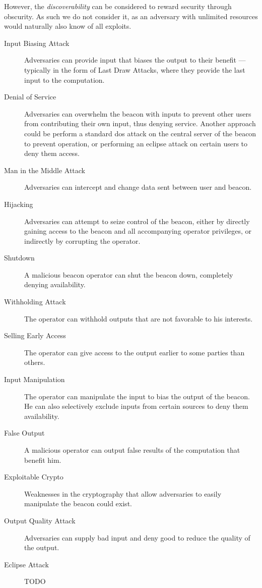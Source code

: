 However, the \emph{discoverability} can be considered to reward security through obscurity. As such we do not consider it, as an adversary with unlimited resources would naturally also know of all exploits.
\begin{description}
    \item [Input Biasing Attack] Adversaries can provide input that biases the output to their benefit --- typically in the form of Last Draw Attacks, where they provide the last input to the computation.
    \item [Denial of Service] Adversaries can overwhelm the beacon with inputs to prevent other users from contributing their own input, thus denying service. Another approach could be perform a standard \gls{dos} attack on the central server of the beacon to prevent operation, or performing an eclipse attack on certain users to deny them access.
    \item [Man in the Middle Attack] Adversaries can intercept and change data sent between user and beacon.
    \item [Hijacking] Adversaries can attempt to seize control of the beacon, either by directly gaining access to the beacon and all accompanying operator privileges, or indirectly by corrupting the operator.
    \item [Shutdown] A malicious beacon operator can shut the beacon down, completely denying availability.
    \item [Withholding Attack] The operator can withhold outputs that are not favorable to his interests.
    \item [Selling Early Access] The operator can give access to the output earlier to some parties than others.
    \item [Input Manipulation] The operator can manipulate the input to bias the output of the beacon. He can also selectively exclude inputs from certain sources to deny them availability.
    \item [False Output] A malicious operator can output false results of the computation that benefit him.
    \item [Exploitable Crypto] Weaknesses in the cryptography that allow adversaries to easily manipulate the beacon could exist.
    \item [Output Quality Attack] Adversaries can supply bad input and deny good to reduce the quality of the output.
    \item [Eclipse Attack] TODO

\end{description}

